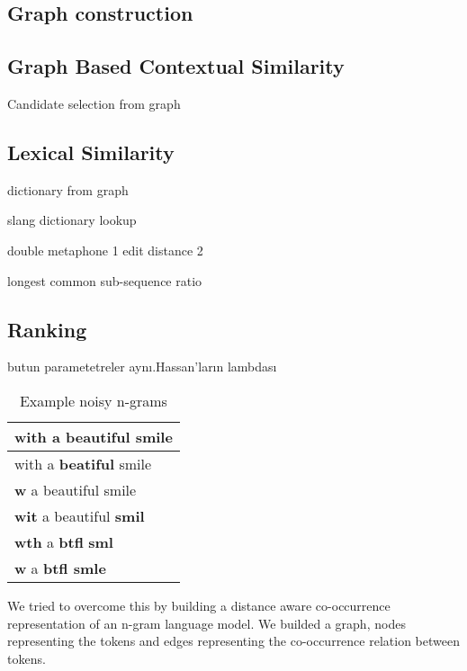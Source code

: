 


\subsection{Graph construction}

\subsection{Graph Based Contextual Similarity}


Candidate selection from graph

\subsection{Lexical Similarity}

dictionary from graph

slang dictionary lookup

double metaphone 1
edit distance 2


longest common sub-sequence ratio



\subsection{Ranking}

butun parametetreler aynı.Hassan'ların lambdası

\begin{table}[tbhp]
\begin{centering}
\caption{Example noisy n-grams}
\label{tab:ngrams}
\begin{tabular}[h]{l}
\hline
with a beautiful smile \\
\hline
with a \textbf{beatiful} smile \\
\textbf{w} a beautiful smile \\
\textbf{wit} a beautiful \textbf{smil} \\
\textbf{wth} a \textbf{btfl} \textbf{sml} \\
\textbf{w} a \textbf{btfl smle} \\
\hline
\end{tabular}
\par\end{centering}
\end{table}





We tried to overcome this by building a distance aware co-occurrence representation of an n-gram language model. We builded a  graph, nodes representing the tokens and edges representing the co-occurrence relation between tokens.

